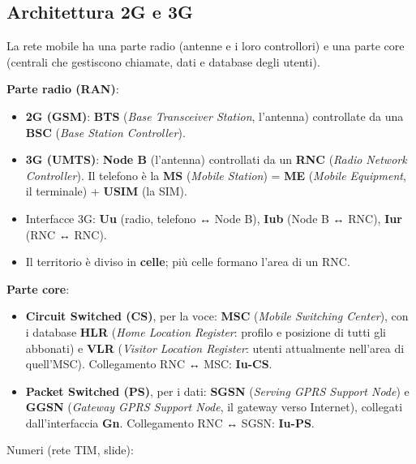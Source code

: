 \subsection{Architettura 2G e 3G}

\begin{inbreve}

La rete mobile ha una parte radio (antenne e i loro controllori) e una parte core (centrali che gestiscono chiamate, dati e database degli utenti).

\end{inbreve}

\textbf{Parte radio (RAN)}:

\begin{itemize}
\tightlist
\item
  \textbf{2G (GSM)}: \textbf{BTS} (\emph{Base Transceiver Station}, l'antenna) controllate da una \textbf{BSC} (\emph{Base Station Controller}).
\item
  \textbf{3G (UMTS)}: \textbf{Node B} (l'antenna) controllati da un \textbf{RNC} (\emph{Radio Network Controller}). Il telefono è la \textbf{MS} (\emph{Mobile Station}) = \textbf{ME} (\emph{Mobile Equipment}, il terminale) + \textbf{USIM} (la SIM).
\item
  Interfacce 3G: \textbf{Uu} (radio, telefono ↔ Node B), \textbf{Iub} (Node B ↔ RNC), \textbf{Iur} (RNC ↔ RNC).
\item
  Il territorio è diviso in \textbf{celle}; più celle formano l'area di un RNC.
\end{itemize}

\textbf{Parte core}:

\begin{itemize}
\tightlist
\item
  \textbf{Circuit Switched (CS)}, per la voce: \textbf{MSC} (\emph{Mobile Switching Center}), con i database \textbf{HLR} (\emph{Home Location Register}: profilo e posizione di tutti gli abbonati) e \textbf{VLR} (\emph{Visitor Location Register}: utenti attualmente nell'area di quell'MSC). Collegamento RNC ↔ MSC: \textbf{Iu-CS}.
\item
  \textbf{Packet Switched (PS)}, per i dati: \textbf{SGSN} (\emph{Serving GPRS Support Node}) e \textbf{GGSN} (\emph{Gateway GPRS Support Node}, il gateway verso Internet), collegati dall'interfaccia \textbf{Gn}. Collegamento RNC ↔ SGSN: \textbf{Iu-PS}.
\end{itemize}

Numeri (rete TIM, slide):

